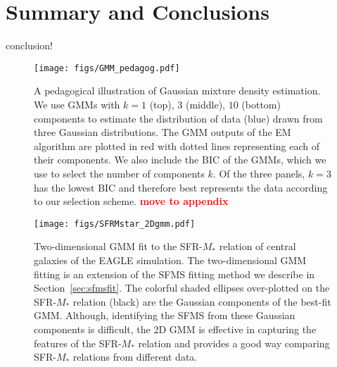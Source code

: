 \documentclass[preprint2,tighten]{aastex62}
\newcommand{\todo}[1]{{\bf \textcolor{red}{ #1}}}
\begin{document}
\section{Summary and Conclusions} \label{sec:summary}
conclusion!

\appendix
\begin{figure}
\begin{center}
\texttt{[image: figs/GMM\_pedagog.pdf]} 
\caption{A pedagogical illustration of Gaussian mixture density estimation. 
We use GMMs with $k = 1$ (top), $3$ (middle), $10$ (bottom) components to estimate 
the distribution of data (blue) drawn from three Gaussian distributions. The GMM 
outputs of the EM algorithm are plotted in red with dotted lines representing each 
of their components. We also include the BIC of the GMMs, which we use to select 
the number of components $k$. Of the three panels, $k=3$ has the lowest BIC and 
therefore best represents the data according to our selection 
scheme. \todo{move to appendix}} \label{fig:gmm_pedagog}
\end{center}
\end{figure}

\begin{figure*}
\begin{center}
\texttt{[image: figs/SFRMstar\_2Dgmm.pdf]} 
\caption{Two-dimensional GMM fit to the SFR-$M_*$ relation of central galaxies
of the EAGLE simulation. The two-dimensional GMM fitting is an extension of the 
SFMS fitting method we describe in Section~\ref{sec:sfmsfit}. The colorful shaded
ellipses over-plotted on the SFR-$M_*$ relation (black) are the Gaussian components 
of the best-fit GMM. Although, identifying the SFMS from these Gaussian components
is difficult, the 2D GMM is effective in capturing the features of the SFR-$M_*$ 
relation and provides a good way comparing SFR-$M_*$ relations from different data.
} \label{fig:2dgmm}
\end{center}
\end{figure*}
\end{document}

